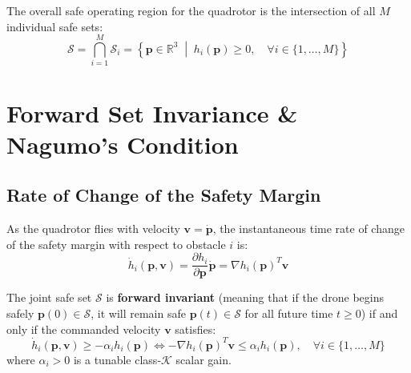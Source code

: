 \documentclass[11pt,a4paper]{article}
\begin{document}
\begin{definitionbox}
The overall safe operating region for the quadrotor is the intersection of all $M$ individual safe sets:
\begin{equation}
\mathcal{S} = \bigcap_{i=1}^M \mathcal{S}_i = \left\{ \mathbf{p} \in \mathbb{R}^3 \;\middle|\; h_i(\mathbf{p}) \ge 0, \quad \forall i \in \{1, \dots, M\} \right\}
\label{eq:joint_safe_set}
\end{equation}
\end{definitionbox}

\section{Forward Set Invariance \& Nagumo's Condition}

\subsection{Rate of Change of the Safety Margin}
As the quadrotor flies with velocity $\mathbf{v} = \mathbf{\dot{p}}$, the instantaneous time rate of change of the safety margin with respect to obstacle $i$ is:
\begin{equation}
\dot{h}_i(\mathbf{p}, \mathbf{v}) = \frac{\partial h_i}{\partial \mathbf{p}} \mathbf{\dot{p}} = \nabla h_i(\mathbf{p})^T \mathbf{v}
\label{eq:h_dot}
\end{equation}

\begin{definitionbox}
The joint safe set $\mathcal{S}$ is \textbf{forward invariant} (meaning that if the drone begins safely $\mathbf{p}(0) \in \mathcal{S}$, it will remain safe $\mathbf{p}(t) \in \mathcal{S}$ for all future time $t \ge 0$) if and only if the commanded velocity $\mathbf{v}$ satisfies:
\begin{equation}
\dot{h}_i(\mathbf{p}, \mathbf{v}) \ge -\alpha_i h_i(\mathbf{p}) \iff -\nabla h_i(\mathbf{p})^T \mathbf{v} \le \alpha_i h_i(\mathbf{p}), \quad \forall i \in \{1, \dots, M\}
\label{eq:nagumo_condition}
\end{equation}
where $\alpha_i > 0$ is a tunable class-$\mathcal{K}$ scalar gain.
\end{definitionbox}
\end{document}
